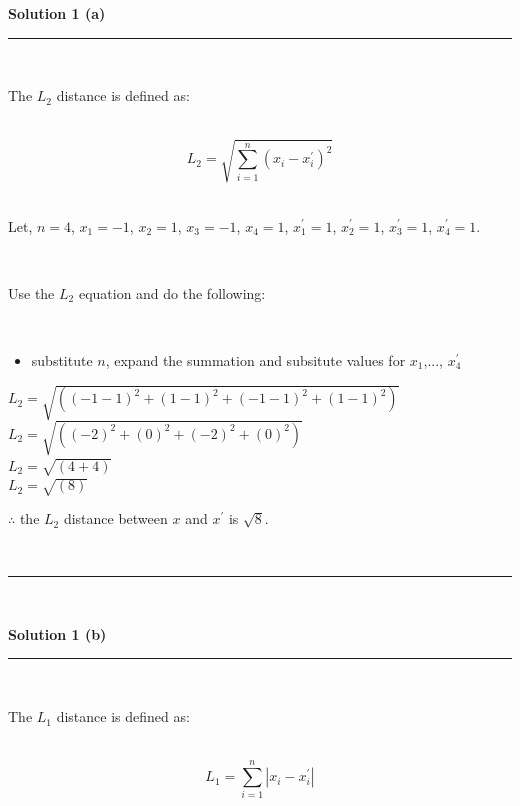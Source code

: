 \documentclass{article}
\begin{document}
\pagestyle{fancy}



\textbf{Solution 1 (a)}

\noindent\rule{\textwidth}{0.4pt}\\

\parbox{\textwidth}{The $L_2$ distance is defined as:}\\

$$L_2 = \sqrt{\sum_{i=1}^{n} (x_i - x^{\prime}_i)^2}$$\\

\parbox{\textwidth}{Let, $n = 4$, $x_1 = -1$, $x_2 = 1$, $x_3 = -1$, $x_4 = 1$, $x^{\prime}_1 = 1$, $x^{\prime}_2 = 1$, $x^{\prime}_3 = 1$, $x^{\prime}_4 = 1$.}\\

\parbox{\textwidth}{Use the $L_2$ equation and do the following:}\\

\begin{itemize}
    \item {substitute $n$, expand the summation and subsitute values for $x_1$,..., $x^{\prime}_4$}\\
\end{itemize}

$L_2 = \sqrt{\left((-1 - 1)^2+(1 - 1)^2+(-1 - 1)^2+(1 - 1)^2\right)}$\\

$L_2 = \sqrt{\left((-2)^2+(0)^2+(-2)^2+(0)^2\right)}$\\

$L_2 = \sqrt{\left(4+4\right)}$\\

$L_2 = \sqrt{\left(8\right)}$\\

\parbox{\textwidth}{$\therefore$ the $L_2$ distance between $x$ and $x^{\prime}$ is $\sqrt{8}$.}\\

\noindent\rule{\textwidth}{0.4pt}\\

\newpage

\textbf{Solution 1 (b)}

\noindent\rule{\textwidth}{0.4pt}\\

\parbox{\textwidth}{The $L_1$ distance is defined as:}\\

$$L_1 = \sum_{i=1}^{n} |x_i - x^{\prime}_i|$$\\
\end{document}
